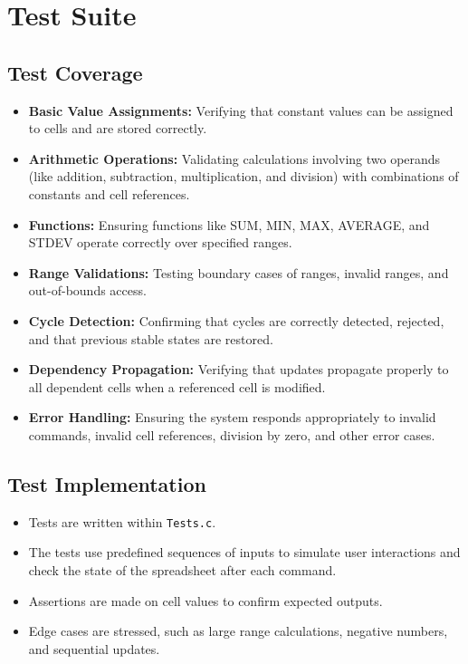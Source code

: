 \documentclass{article}
\begin{document}
\section{Test Suite}
\subsection{Test Coverage}
\begin{itemize}
    \item \textbf{Basic Value Assignments:} Verifying that constant values can be assigned to cells and are stored correctly.
    \item \textbf{Arithmetic Operations:} Validating calculations involving two operands (like addition, subtraction, multiplication, and division) with combinations of constants and cell references.
    \item \textbf{Functions:} Ensuring functions like SUM, MIN, MAX, AVERAGE, and STDEV operate correctly over specified ranges.
    \item \textbf{Range Validations:} Testing boundary cases of ranges, invalid ranges, and out-of-bounds access.
    \item \textbf{Cycle Detection:} Confirming that cycles are correctly detected, rejected, and that previous stable states are restored.
    \item \textbf{Dependency Propagation:} Verifying that updates propagate properly to all dependent cells when a referenced cell is modified.
    \item \textbf{Error Handling:} Ensuring the system responds appropriately to invalid commands, invalid cell references, division by zero, and other error cases.
\end{itemize}

\subsection{Test Implementation}
\begin{itemize}
    \item Tests are written within \texttt{Tests.c}.
    \item The tests use predefined sequences of inputs to simulate user interactions and check the state of the spreadsheet after each command.
    \item Assertions are made on cell values to confirm expected outputs.
    \item Edge cases are stressed, such as large range calculations, negative numbers, and sequential updates.
\end{itemize}
\end{document}
